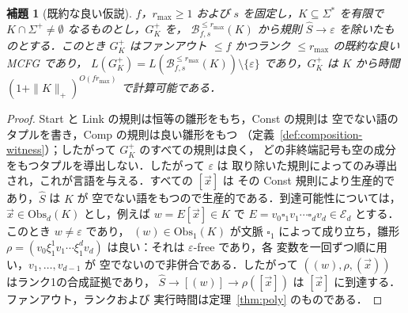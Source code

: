 \documentclass[11pt,a4paper]{ltjsarticle}
\numberwithin{equation}{section}
\theoremstyle{plain}
\newtheorem{lemma}[theorem]{補題}
\theoremstyle{definition}
\theoremstyle{remark}
\newcommand{\tuple}[1]{\vec{#1}}
\newcommand{\blank}{\square}
\newcommand{\eps}{\varepsilon}
\theoremstyle{plain}
\begin{document}
\begin{lemma}[既約な良い仮説]
\label{lem:reduced-good-hypothesis}
$f$，$r_{\max}\ge1$ および $s$ を固定し，$K\subseteq\Sigma^*$ を有限で
$K\cap\Sigma^+\ne\emptyset$ なるものとし，$G^+_K$ を，
$\mathcal B^{\le r_{\max}}_{f,s}(K)$ から規則 $\widehat S\to\eps$ を除いたものとする．このとき
$G^+_K$ はファンアウト $\le f$ かつランク $\le r_{\max}$ の既約な良い MCFG であり，
$L(G^+_K)=L(\mathcal B^{\le r_{\max}}_{f,s}(K))\setminus\{\eps\}$ であり，$G^+_K$ は
$K$ から時間 $(1+\|K\|_+)^{O(fr_{\max})}$ で計算可能である．
\end{lemma}

\begin{proof}
Start と Link の規則は恒等の雛形をもち，Const の規則は
空でない語のタプルを書き，Comp の規則は良い雛形をもつ
（定義~\ref{def:composition-witness}）；したがって $G^+_K$ のすべての規則は良く，
どの非終端記号も空の成分をもつタプルを導出しない．したがって $\eps$ は
取り除いた規則によってのみ導出され，これが言語を与える．すべての $[\tuple x]$ は
その Const 規則により生産的であり，$\widehat S$ は $K$ が
空でない語をもつので生産的である．到達可能性については，$\tuple x\in\mathrm{Obs}_d(K)$ とし，例えば
$w=E[\tuple x]\in K$ で $E=v_0\blank_1v_1\cdots\blank_dv_d\in\mathcal E_d$ とする．このとき $w\ne\eps$ であり，
$(w)\in\mathrm{Obs}_1(K)$ が文脈 $\blank_1$ によって成り立ち，雛形
$\rho=(v_0\xi_1^1v_1\cdots\xi_1^dv_d)$ は良い：それは $\eps$-free であり，各
変数を一回ずつ順に用い，$v_1,\ldots,v_{d-1}$ が
空でないので非併合である．したがって $((w),\rho,(\tuple x))$ はランク1の合成証拠であり，
$\widehat S\to[(w)]\to\rho([\tuple x])$ は $[\tuple x]$ に到達する．ファンアウト，ランクおよび
実行時間は定理~\ref{thm:poly} のものである．
\end{proof}
\end{document}
